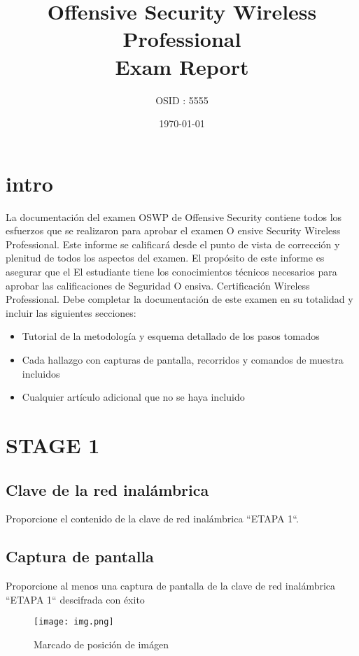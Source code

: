 \documentclass[titlepage,12pt]{article}
\title{Offensive Security Wireless Professional \\ Exam Report}
\author{OSID : 5555}
\date{\today}
\begin{document}
\maketitle          
\tableofcontents    %
\newpage    %

\section{intro}
La documentación del examen OSWP de Offensive Security contiene todos los esfuerzos que se realizaron para
aprobar el examen O ensive Security Wireless Professional. Este informe se calificará desde el punto de vista de
corrección y plenitud de todos los aspectos del examen. El propósito de este informe es asegurar que el
El estudiante tiene los conocimientos técnicos necesarios para aprobar las calificaciones de Seguridad O ensiva.
Certificación Wireless Professional. Debe completar la documentación de este examen en su totalidad y
incluir las siguientes secciones:

\begin{itemize}
    \item Tutorial de la metodología y esquema detallado de los pasos tomados
    \item Cada hallazgo con capturas de pantalla, recorridos y comandos de muestra incluidos
    \item Cualquier artículo adicional que no se haya incluido
\end{itemize}

\newpage    %

\section{STAGE 1}
\subsection{Clave de la red inalámbrica}
Proporcione el contenido de la clave de red inalámbrica ``ETAPA 1``.

\subsection{Captura de pantalla}
Proporcione al menos una captura de pantalla de la clave de red inalámbrica ``ETAPA 1`` descifrada con éxito

    \begin{figure}[h]
      \centering
        \texttt{[image: img.png]}
      \caption[width=\textwidth]{Marcado de posición de imágen}
    \end{figure}
\end{document}
